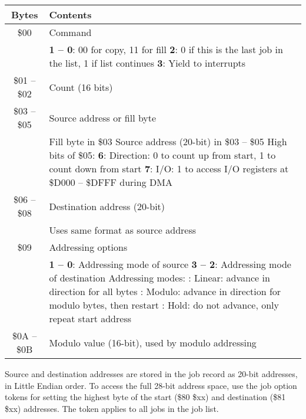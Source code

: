 \begin{center}
\begin{tabular}{|c|p{6cm}|}
\hline
{\bf Bytes} & {\bf Contents} \\
\hline

\$00 & Command \\
& {\bf 1 -- 0}: 00 for copy, 11 for fill \newline
{\bf 2}: 0 if this is the last job in the list, 1 if list continues \newline
{\bf 3}: Yield to interrupts \\
\hline

\$01 -- \$02 & Count (16 bits) \\
\hline

\$03 -- \$05 & Source address or fill byte \\
& Fill byte in \$03 \newline
Source address (20-bit) in \$03 -- \$05 \newline
High bits of \$05: \newline
{\bf 6}: Direction: 0 to count up from start, 1 to count down from start \newline
{\bf 7}: I/O: 1 to access I/O registers at \$D000 -- \$DFFF during DMA \\
\hline

\$06 -- \$08 & Destination address (20-bit) \\
& Uses same format as source address \\
\hline

\$09 & Addressing options \\
& {\bf 1 -- 0}: Addressing mode of source \newline
{\bf 3 -- 2}: Addressing mode of destination \newline
Addressing modes: \newline
00: Linear: advance in direction for all bytes \newline
01: Modulo: advance in direction for modulo bytes, then restart \newline
10: Hold: do not advance, only repeat start address \\
\hline

\$0A -- \$0B & Modulo value (16-bit), used by modulo addressing \\
\hline

\end{tabular}
\end{center}

Source and destination addresses are stored in the job record as 20-bit
addresses, in Little Endian order. To access the full 28-bit address space, use
the job option tokens for setting the highest byte of the start (\$80 \$xx) and
destination (\$81 \$xx) addresses. The token applies to all jobs in the job list.

